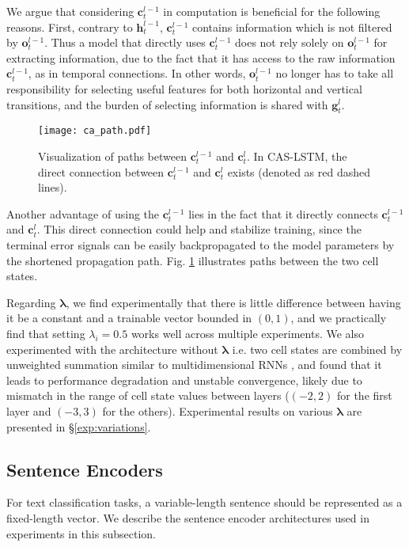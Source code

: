 \documentclass[wcp]{jmlr}
\begin{document}
    We argue that considering $\mathbf{c}_t^{l-1}$ in computation is beneficial for the following reasons.
    First, contrary to $\mathbf{h}_t^{l-1}$, $\mathbf{c}_t^{l-1}$ contains information which is not filtered by $\mathbf{o}_t^{l-1}$.
    Thus a model that directly uses $\mathbf{c}_t^{l-1}$ does not rely solely on $\mathbf{o}_t^{l-1}$ for extracting information, due to the fact that it has access to the raw information $\mathbf{c}_t^{l-1}$, as in temporal connections.
    In other words, $\mathbf{o}_t^{l-1}$ no longer has to take all responsibility for selecting useful features for both horizontal and vertical transitions, and the burden of selecting information is shared with $\mathbf{g}_t^l$.
    
    \begin{figure}
        \centering
        \texttt{[image: ca\_path.pdf]}
        \caption{
            Visualization of paths between $\mathbf{c}_t^{l-1}$ and $\mathbf{c}_t^l$.
            In CAS-LSTM, the direct connection between $\mathbf{c}_t^{l-1}$ and $\mathbf{c}_t^l$ exists (denoted as red dashed lines).
        }
        \label{fig:ca_path}
    \end{figure}
    
    Another advantage of using the $\mathbf{c}_t^{l-1}$ lies in the fact that it directly connects $\mathbf{c}_t^{l-1}$ and $\mathbf{c}_t^l$.
    This direct connection could help and stabilize training, since the terminal error signals can be easily backpropagated to the model parameters by the shortened propagation path.
    Fig. \ref{fig:ca_path} illustrates paths between the two cell states.
    
    Regarding $\bm\lambda$, we find experimentally that there is little difference between having it be a constant and a trainable vector bounded in $(0, 1)$, and we practically find that setting $\lambda_i=0.5$ works well across multiple experiments.
    We also experimented with the architecture without $\bm\lambda$ i.e. two cell states are combined by unweighted summation similar to multidimensional RNNs \citep{graves2009offline}, and found that it leads to performance degradation and unstable convergence, likely due to mismatch in the range of cell state values between layers ($(-2, 2)$ for the first layer and $(-3, 3)$ for the others).
    Experimental results on various $\bm\lambda$ are presented in \S\ref{exp:variations}.
    
    
    
    \subsection{Sentence Encoders}
    For text classification tasks, a variable-length sentence should be represented as a fixed-length vector.
    We describe the sentence encoder architectures used in experiments in this subsection.
    
\end{document}
